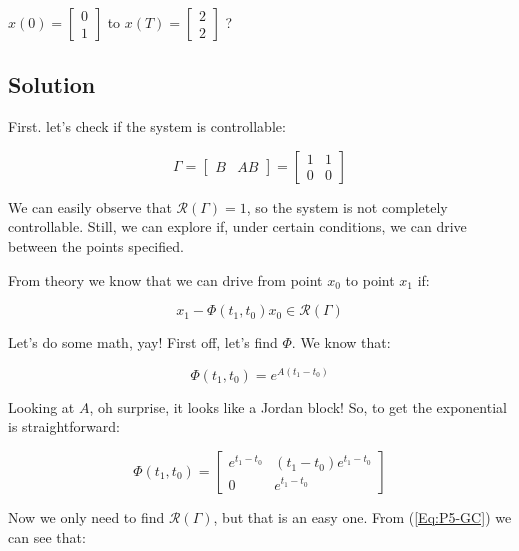 \documentclass[10pt,a4paper]{article}
\begin{document}
\begin{center}
$x(0) = \begin{bmatrix}0 \\ 1 \end{bmatrix}$ to $x(T) = \begin{bmatrix}2 \\ 2 \end{bmatrix}$ ?
\end{center}

\subsection*{Solution}
First. let's check if the system is controllable:

\begin{equation}
\Gamma = \begin{bmatrix} B & AB \end{bmatrix}  = 
\begin{bmatrix} 
1 & 1 \\
0 & 0 
\end{bmatrix}
\label{Eq:P5-GC}
\end{equation}

We can easily observe that $ \mathcal{R}(\Gamma) = 1$, so the system is not completely controllable. Still, we can explore if, under certain conditions, we can drive between the points specified. 
\medskip

From theory we know that we can drive from point $x_{0}$ to point $x_{1}$ if:

\begin{equation}  
x_{1} - \Phi(t_{1}, t_{0})x_{0} \in \mathcal{R}(\Gamma) 
\label{Eq:P5-CCEq}
\end{equation}

Let's do some math, yay! First off, let's find $\Phi$. We know that:

\[ \Phi(t_{1}, t_{0}) = e^{A(t_{1} - t_{0})} \]

Looking at $A$, oh surprise, it looks like a Jordan block! So, to get the exponential is straightforward:

\[ \Phi(t_{1}, t_{0}) = 
\begin{bmatrix}
e^{t_{1} - t_{0}} & (t_{1} - t_{0})e^{t_{1} - t_{0}} \\
0 & e^{t_{1} - t_{0}}
\end{bmatrix}
\]

Now we only need to find $\mathcal{R}(\Gamma)$, but that is an easy one. From (\ref{Eq:P5-GC}) we can see that:
\end{document}
